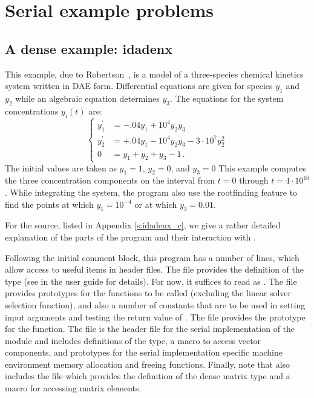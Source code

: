 \section{Serial example problems}\label{s:ex_serial}

\subsection{A dense example: idadenx}\label{ss:idadenx}

This example, due to Robertson~\cite{Rob:66}, is a model of a three-species 
chemical kinetics system written in DAE form. Differential equations are given 
for species $y_1$ and $y_2$ while an algebraic equation determines $y_3$. The 
equations for the system concentrations $y_i(t)$ are:
\begin{equation}\label{e:idadenx_DAE}
\begin{cases}
  y^\prime_1 &= -.04 y_1 + 10^4 y_2 y_3   \\
  y^\prime_2 &= +.04 y_1 - 10^4 y_2 y_3 - 3 \cdot 10^7 y_2^2  \\
  0 &=  y_1 + y_2 + y_3 - 1 \, .
\end{cases}
\end{equation}
The initial values are taken as $y_1 = 1$, $y_2 = 0$, and $y_3 = 0$
This example computes the three concentration components on the interval
from $t=0$ through $t=4 \cdot 10^{10}$.
While integrating the system, the program also use the rootfinding
feature to find the points at which $y_1 = 10^{-4}$ or at which
$y_3 = 0.01$.

For the source, listed in Appendix \ref{s:idadenx_c}, we give a rather detailed
explanation of the parts of the program and their interaction with {\ida}.

Following the initial comment block, this program has a number
of  lines, which allow access to useful items in {\ida}
header files.  The  file provides the definition of the
type  (see  in the user guide \cite{ida2.4.0_ug}
for details).  For now, it suffices to read  as .
The  file provides prototypes for the {\ida}
functions to be called (excluding the linear solver selection
function), and also a number of constants that are to be used in
setting input arguments and testing the return value of .
The  file provides the prototype for the  function.
The  file is the header file for the serial
implementation of the {\nvector} module and includes definitions of the 
 type, a macro to access vector components, and prototypes 
for the serial implementation specific machine environment memory allocation
and freeing functions.
Finally, note that  also includes the  file which 
provides the definition of the dense matrix type  and a macro for 
accessing matrix elements.

